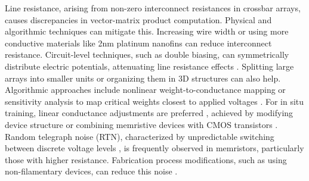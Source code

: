 
\noindent Line resistance, arising from non-zero interconnect resistances in crossbar arrays, causes discrepancies in vector-matrix product computation. Physical and algorithmic techniques can mitigate this. Increasing wire width \cite{li2017three} or using more conductive materials like 2nm platinum nanofins \cite{pi2019memristor} can reduce interconnect resistance. Circuit-level techniques, such as double biasing, can symmetrically distribute electric potentials, attenuating line resistance effects \cite{hu2016dot}. Splitting large arrays into smaller units \cite{xia2016technological} or organizing them in 3D structures \cite{xia2019memristive} can also help. Algorithmic approaches include nonlinear weight-to-conductance mapping or sensitivity analysis to map critical weights closest to applied voltages \cite{agrawal2019x}. For in situ training, linear conductance adjustments are preferred \cite{burr2015experimental}, achieved by modifying device structure \cite{woo2016improved, wu2018methodology} or combining memristive devices with CMOS transistors \cite{ambrogio2018equivalent}.\\


\noindent Random telegraph noise (RTN), characterized by unpredictable switching between discrete voltage levels \cite{puglisi2016guidelines}, is frequently observed in memristors, particularly those with higher resistance. Fabrication process modifications, such as using non-filamentary devices, can reduce this noise \cite{chai2018impact}.\\

